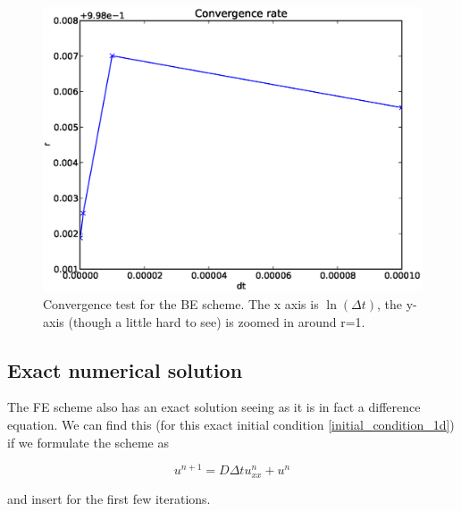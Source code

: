 \begin{figure}[H]
 \centering
 \includegraphics[scale=0.7]{../doc/results/experiment_13012014_0925_Simple1DConvergenceTestBE/results/ConvergenceTest.eps}
 \caption{Convergence test for the BE scheme. The x axis is $\ln(\Delta t)$, the y-axis (though a little hard to see) is zoomed in around r=1.}
 \label{convergence_test_FE}
\end{figure}



\subsection{Exact numerical solution}\label{exact_numerical_solution}

The FE scheme also has an exact solution seeing as it is in fact a difference equation. 
We can find this (for this exact initial condition \ref{initial_condition_1d}) if we formulate the scheme as 

\begin{equation}
 u^{n+1} = D\Delta t u_{xx}^n + u^n
\end{equation}

and insert for the first few iterations. 

